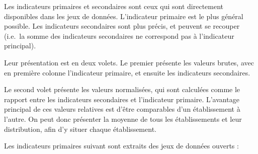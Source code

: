 \documentclass[12pt,french,]{article}
\begin{document}
Les indicateurs primaires et secondaires sont ceux qui sont directement
disponibles dans les jeux de données. L'indicateur primaire est le plus
général possible. Les indicateurs secondaires sont plus précis, et
peuvent se recouper (i.e.~la somme des indicateurs secondaires ne
correspond pas à l'indicateur principal).

Leur présentation est en deux volets. Le premier présente les valeurs
brutes, avec en première colonne l'indicateur primaire, et ensuite les
indicateurs secondaires.

Le second volet présente les valeurs normalisées, qui sont calculées
comme le rapport entre les indicateurs secondaires et l'indicateur
primaire. L'avantage principal de ces valeurs relatives est d'être
comparables d'un établissement à l'autre. On peut donc présenter la
moyenne de tous les établissements et leur distribution, afin d'y situer
chaque établissement.

Les indicateurs primaires suivant sont extraits des jeux de données
ouverts :
\end{document}
